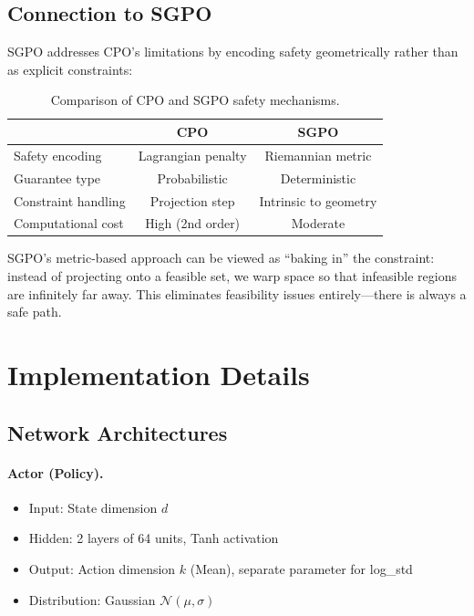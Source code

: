 \subsection{Connection to SGPO}

SGPO addresses CPO's limitations by encoding safety geometrically rather than as explicit constraints:

\begin{table}[H]
\centering
\small
\caption{Comparison of CPO and SGPO safety mechanisms.}
\label{tab:cpo_sgpo_comparison}
\begin{tabular}{@{}lcc@{}}
\toprule
& \textbf{CPO} & \textbf{SGPO} \\
\midrule
Safety encoding & Lagrangian penalty & Riemannian metric \\
Guarantee type & Probabilistic & Deterministic \\
Constraint handling & Projection step & Intrinsic to geometry \\
Computational cost & High (2nd order) & Moderate \\
\bottomrule
\end{tabular}
\end{table}

SGPO's metric-based approach can be viewed as ``baking in'' the constraint: instead of projecting onto a feasible set, we warp space so that infeasible regions are infinitely far away. This eliminates feasibility issues entirely---there is always a safe path.

\section{Implementation Details}
\label{app:implementation}

\subsection{Network Architectures}

\paragraph{Actor (Policy).}
\begin{itemize}
    \item Input: State dimension $d$
    \item Hidden: 2 layers of 64 units, Tanh activation
    \item Output: Action dimension $k$ (Mean), separate parameter for log\_std
    \item Distribution: Gaussian $\mathcal{N}(\mu, \sigma)$
\end{itemize}

